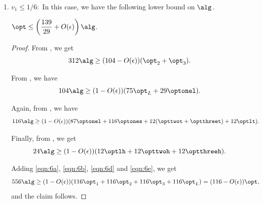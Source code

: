 \begin{enumerate}


    \item $v_1 \le 1/6:$ In this case, we have the following lower bound on $\alg$.


    \begin{claim}
    \label{cla:139by29}
        $\displaystyle\opt \le \left(\frac{139}{29}+O(\epsilon)\right)\alg$.
    \end{claim}
    \begin{proof}
        From , we get
        \begin{equation}
        \label{eqn:6a}
            312\alg \ge (104-O(\epsilon))(\opt_2 + \opt_3).
        \end{equation}

        From , we have
        \begin{equation}
        \label{eqn:6b}
            104\alg \ge (1-O(\epsilon))(75\opt_L + 29\optonel).
        \end{equation}

        Again, from , we have 
        \begin{equation}
        \label{eqn:6d}
            116\alg \ge (1-O(\epsilon))(87\optonel + 116\optones + 12(\opttwot + \optthreet)+ 12\optlt).
        \end{equation}

        Finally, from , we get
        \begin{equation}
        \label{eqn:6e}
            24\alg \ge (1-O(\epsilon))(12\optlh + 12\opttwoh + 12\optthreeh).
        \end{equation}

        Adding \eqref{eqn:6a}, \eqref{eqn:6b}, \eqref{eqn:6d} and \eqref{eqn:6e}, we get
        \[ 556\alg \ge (1-O(\epsilon))(116\opt_1 + 116\opt_2 + 116\opt_3 + 116\opt_L) = (116-O(\epsilon))\opt,\]
        and the claim follows.        
    \end{proof}


\end{enumerate}
